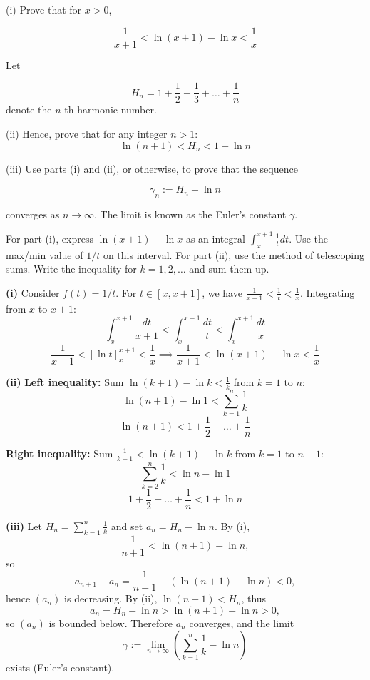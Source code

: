 \begin{problem}
(i) Prove that for $x > 0$, 

\[\frac{1}{x+1} < \ln(x+1) - \ln x < \frac{1}{x} \]

Let 

\[H_n = 1 + \frac{1}{2} + \frac{1}{3} + \dots + \frac{1}{n}\] denote the $n$-th harmonic number.

(ii) Hence, prove that for any integer $n > 1$:
\[ \ln(n+1) < H_n < 1 + \ln n \]

(iii) Use parts (i) and (ii), or otherwise, to prove that the sequence

\[ \gamma_n := H_n - \ln n \]

converges as $n \to \infty$. The limit is known as the Euler's constant $\gamma$.

\end{problem}

\begin{hint}
For part (i), express $\ln(x+1) - \ln x$ as an integral $\int_x^{x+1} \frac{1}{t} dt$. Use the max/min value of $1/t$ on this interval.
For part (ii), use the method of telescoping sums. Write the inequality for $k=1, 2, \dots$ and sum them up.
\end{hint}

\begin{solution}
\textbf{(i)} Consider $f(t) = 1/t$. For $t \in [x, x+1]$, we have $\frac{1}{x+1} < \frac{1}{t} < \frac{1}{x}$.
Integrating from $x$ to $x+1$:
\[ \int_x^{x+1} \frac{dt}{x+1} < \int_x^{x+1} \frac{dt}{t} < \int_x^{x+1} \frac{dt}{x} \]
\[ \frac{1}{x+1} < [\ln t]_x^{x+1} < \frac{1}{x} \implies \frac{1}{x+1} < \ln(x+1) - \ln x < \frac{1}{x} \]

\textbf{(ii)}
\textbf{Left inequality:} Sum $\ln(k+1) - \ln k < \frac{1}{k}$ from $k=1$ to $n$:
\[ \ln(n+1) - \ln 1 < \sum_{k=1}^n \frac{1}{k} \]
\[ \ln(n+1) < 1 + \frac{1}{2} + \dots + \frac{1}{n} \]

\textbf{Right inequality:} Sum $\frac{1}{k+1} < \ln(k+1) - \ln k$ from $k=1$ to $n-1$:
\[ \sum_{k=2}^n \frac{1}{k} < \ln n - \ln 1 \]
\[ 1 + \frac{1}{2} + \dots + \frac{1}{n} < 1 + \ln n \]
\medskip

\textbf{(iii)} Let $H_n = \sum_{k=1}^n \frac{1}{k}$ and set $a_n = H_n - \ln n$. By (i),
\[ \frac{1}{n+1} < \ln(n+1) - \ln n, \]
so
\[ a_{n+1} - a_n = \frac{1}{n+1} - (\ln(n+1) - \ln n) < 0, \]
hence $(a_n)$ is decreasing. By (ii), $\ln(n+1) < H_n$, thus
\[ a_n = H_n - \ln n > \ln(n+1) - \ln n > 0, \]
so $(a_n)$ is bounded below. Therefore $a_n$ converges, and the limit
\[ \gamma := \lim_{n\to\infty} \left(\sum_{k=1}^n \frac{1}{k} - \ln n\right) \]
exists (Euler's constant).
\end{solution}


